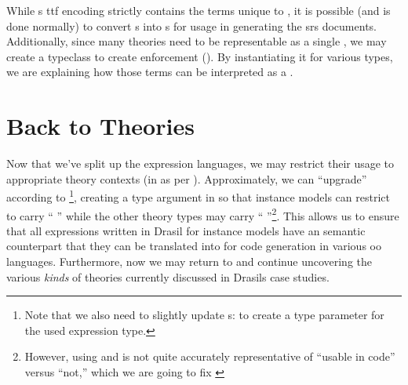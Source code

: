 While \ModelExpr{}s \acs{ttf} encoding strictly contains the terms unique to
\ModelExpr{}, it is possible (and is done normally) to convert \Expr{}s into
\ModelExpr{}s for usage in generating the \acs{srs} documents. Additionally,
since many theories need to be representable as a single \Relation{}, we may
create a typeclass to create enforcement (). By
instantiating it for various types, we are explaining how those terms can be
interpreted as a \ModelExpr{}.

\currentExpressHaskell{}
 
\section{Back to Theories}
\label{chap:lang-division:sec:back-to-theories}

Now that we've split up the expression languages, we may restrict their usage to
appropriate theory contexts (in \ModelKinds{} as per ).
Approximately, we can ``upgrade'' \ModelKinds according to
\footnote{Note that we also need to slightly
update \QDefinition{}s:  to create a type
parameter for the used expression type.}, creating a type argument in
\ModelKinds{} so that instance models can restrict to carry ``\ModelKinds{}
\Expr{}'' while the other theory types may carry ``\ModelKinds{}
\ModelExpr{}''\footnote{However, using \Expr{} and \ModelExpr{} is not quite
accurately representative of ``usable in code'' versus ``not,'' which we are
going to fix \cite{DrasilIssue2853AlternativeModelKinds}}. This allows us to
ensure that all expressions written in Drasil for instance models have an
semantic counterpart that they can be translated into for code generation in
various \acs{oo} languages. Furthermore, now we may return to \ModelKinds{} and
continue uncovering the various \textit{kinds} of theories currently discussed
in Drasils case studies.

\pseudoPartialModelKindsUpgrade{}
